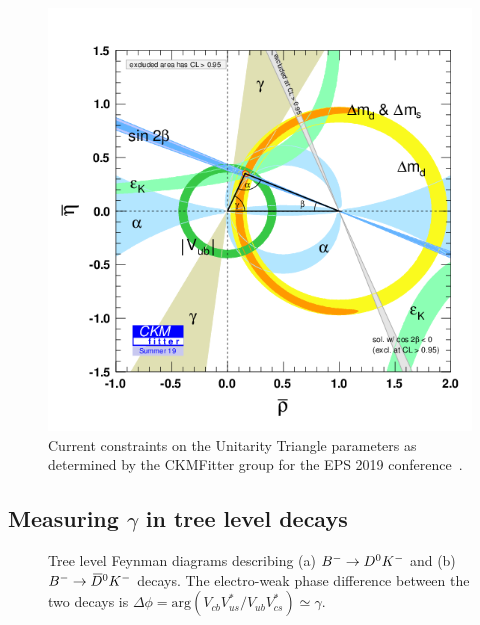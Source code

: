 \begin{figure}[tb]
    \centering
    \includegraphics[width=0.7\columnwidth]{figures/theory/rhoeta_large.png}
    \caption{Current constraints on the Unitarity Triangle parameters as determined by the CKMFitter group for the EPS 2019 conference~\cite{CKMfitter2015}.}
    \label{fig:UT_constraints}
\end{figure}


\subsection{\texorpdfstring{Measuring $\gamma$ in tree level decays}{Measuring gamma in tree level decays}} %
\label{sub:_measuring_gamma_in_tree_level_decays}

\begin{figure}[t]
    \centering
        \begin{subfigure}[t]{0.39\textwidth}
        \hspace{0.7cm}
        
        \caption{}
        \end{subfigure}
        \begin{subfigure}[t]{0.39\textwidth}
        \hspace{0.7cm}
        
        \caption{}
        \end{subfigure}
        \caption{Tree level Feynman diagrams describing (a) ${{{{B}^-}}\rightarrow {\ensuremath{{D}^0}} {\ensuremath{{K}^-}}}$ and (b) ${{{{B}^-}}\rightarrow {\ensuremath{{\kern 0.18em\overline{\kern -0.18em D}}{}^0}} {\ensuremath{{K}^-}}}$ decays. The electro-weak phase difference between the two decays is $\Delta\phi = 
\text{arg}\left( {V_{cb}V_{us}^*}/{V_{ub}V_{cs}^*} \right)\simeq\gamma$.}
        \label{fig:feynman_diagrams}
    
\end{figure}

